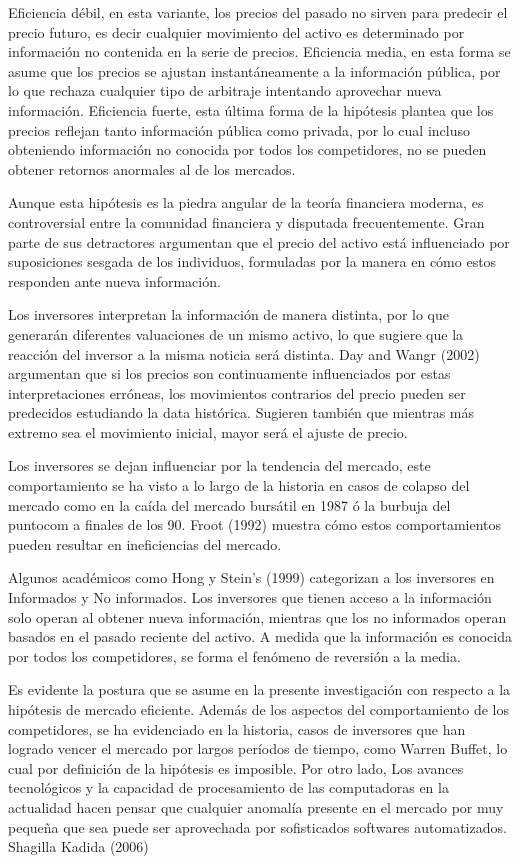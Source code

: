 \documentclass[a4paper,12pt]{Latex/Classes/PhDthesisPSnPDF}
\begin{document}
Eficiencia débil, en esta variante, los precios del pasado no sirven para predecir el precio futuro, es decir cualquier movimiento del activo es determinado por información no contenida en la serie de precios. Eficiencia media, en esta forma se asume que los precios se ajustan instantáneamente a la información pública, por lo que rechaza cualquier tipo de arbitraje intentando aprovechar nueva información. Eficiencia fuerte, esta última forma de la hipótesis plantea que los precios reflejan tanto información pública como privada, por lo cual incluso obteniendo información no conocida por todos los competidores, no se pueden obtener retornos anormales al de los mercados.

Aunque esta hipótesis es la piedra angular de la teoría financiera moderna, es controversial entre la comunidad financiera y disputada frecuentemente. Gran parte de sus detractores argumentan que el precio del activo está influenciado por suposiciones sesgada de los individuos, formuladas por la manera en cómo estos responden ante nueva información.

Los inversores interpretan la información de manera distinta, por lo que generarán diferentes valuaciones de un mismo activo, lo que sugiere que la reacción del inversor a la misma noticia será distinta. Day and Wangr (2002) argumentan que si los precios son continuamente influenciados por estas interpretaciones erróneas, los movimientos contrarios del precio pueden ser predecidos estudiando la data histórica. Sugieren también que mientras más extremo sea el movimiento inicial, mayor será el ajuste de precio.

Los inversores se dejan influenciar por la tendencia del mercado, este comportamiento se ha visto a lo largo de la historia en casos de colapso del mercado como en la caída del mercado bursátil en 1987 ó la burbuja del puntocom a finales de los 90. Froot (1992) muestra cómo estos comportamientos pueden resultar en ineficiencias del mercado.

Algunos académicos como Hong y Stein's (1999) categorizan a los inversores en Informados y No informados. Los inversores que tienen acceso a la información solo operan al obtener nueva información, mientras que los no informados operan basados en el pasado reciente del activo. A medida que la información es conocida por todos los competidores, se forma el fenómeno de reversión a la media.

Es evidente la postura que se asume en la presente investigación con respecto a la hipótesis de mercado eficiente. Además de los aspectos del comportamiento de los competidores, se ha evidenciado en la historia, casos de inversores que han logrado vencer el mercado por largos períodos de tiempo, como Warren Buffet, lo cual por definición de la hipótesis es imposible. Por otro lado, Los avances tecnológicos y la capacidad de procesamiento de las computadoras en la actualidad hacen pensar que cualquier anomalía presente en el mercado por muy pequeña que sea puede ser aprovechada por sofisticados softwares automatizados. Shagilla Kadida (2006)
\end{document}
